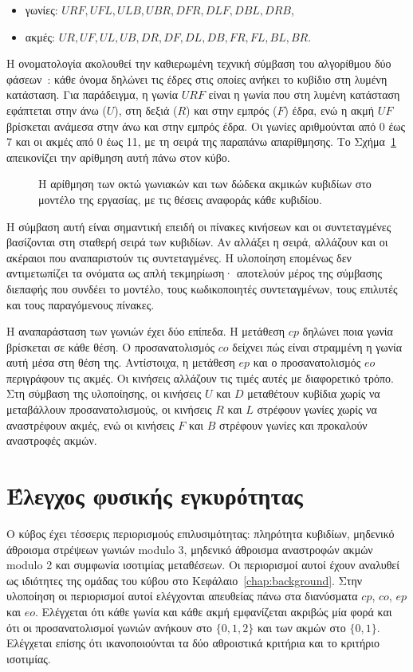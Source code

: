 \begin{itemize}
  \item γωνίες: \(URF, UFL, ULB, UBR, DFR, DLF, DBL, DRB\),
  \item ακμές: \(UR, UF, UL, UB, DR, DF, DL, DB, FR, FL, BL, BR\).
\end{itemize}

Η ονοματολογία ακολουθεί την καθιερωμένη τεχνική σύμβαση του αλγορίθμου δύο φάσεων~\cite{kociembaImplementationDetails}: κάθε όνομα δηλώνει τις έδρες στις οποίες ανήκει το κυβίδιο στη λυμένη κατάσταση. Για παράδειγμα, η γωνία \(URF\) είναι η γωνία που στη λυμένη κατάσταση εφάπτεται στην άνω (\(U\)), στη δεξιά (\(R\)) και στην εμπρός (\(F\)) έδρα, ενώ η ακμή \(UF\) βρίσκεται ανάμεσα στην άνω και στην εμπρός έδρα. Οι γωνίες αριθμούνται από 0 έως 7 και οι ακμές από 0 έως 11, με τη σειρά της παραπάνω απαρίθμησης. Το Σχήμα~\ref{fig:cubie-indexing} απεικονίζει την αρίθμηση αυτή πάνω στον κύβο.

\begin{figure}[htbp]\centering

\caption{Η αρίθμηση των οκτώ γωνιακών και των δώδεκα ακμικών κυβιδίων στο μοντέλο της εργασίας, με τις θέσεις αναφοράς κάθε κυβιδίου.}
\label{fig:cubie-indexing}
\end{figure}

Η σύμβαση αυτή είναι σημαντική επειδή οι πίνακες κινήσεων και οι συντεταγμένες βασίζονται στη σταθερή σειρά των κυβιδίων. Αν αλλάξει η σειρά, αλλάζουν και οι ακέραιοι που αναπαριστούν τις συντεταγμένες. Η υλοποίηση επομένως δεν αντιμετωπίζει τα ονόματα ως απλή τεκμηρίωση· αποτελούν μέρος της σύμβασης διεπαφής που συνδέει το μοντέλο, τους κωδικοποιητές συντεταγμένων, τους επιλυτές και τους παραγόμενους πίνακες.

Η αναπαράσταση των γωνιών έχει δύο επίπεδα. Η μετάθεση \(cp\) δηλώνει ποια γωνία βρίσκεται σε κάθε θέση. Ο προσανατολισμός \(co\) δείχνει πώς είναι στραμμένη η γωνία αυτή μέσα στη θέση της. Αντίστοιχα, η μετάθεση \(ep\) και ο προσανατολισμός \(eo\) περιγράφουν τις ακμές. Οι κινήσεις αλλάζουν τις τιμές αυτές με διαφορετικό τρόπο. Στη σύμβαση της υλοποίησης, οι κινήσεις \(U\) και \(D\) μεταθέτουν κυβίδια χωρίς να μεταβάλλουν προσανατολισμούς, οι κινήσεις \(R\) και \(L\) στρέφουν γωνίες χωρίς να αναστρέφουν ακμές, ενώ οι κινήσεις \(F\) και \(B\) στρέφουν γωνίες και προκαλούν αναστροφές ακμών.

\section{Έλεγχος φυσικής εγκυρότητας}
\label{sec:model-validity}
Ο κύβος έχει τέσσερις περιορισμούς επιλυσιμότητας: πληρότητα κυβιδίων, μηδενικό άθροισμα στρέψεων γωνιών modulo 3, μηδενικό άθροισμα αναστροφών ακμών modulo 2 και συμφωνία ισοτιμίας μεταθέσεων. Οι περιορισμοί αυτοί έχουν αναλυθεί ως ιδιότητες της ομάδας του κύβου στο Κεφάλαιο~\ref{chap:background}. Στην υλοποίηση οι περιορισμοί αυτοί ελέγχονται απευθείας πάνω στα διανύσματα \(cp\), \(co\), \(ep\) και \(eo\). Ελέγχεται ότι κάθε γωνία και κάθε ακμή εμφανίζεται ακριβώς μία φορά και ότι οι προσανατολισμοί γωνιών ανήκουν στο \(\{0,1,2\}\) και των ακμών στο \(\{0,1\}\). Ελέγχεται επίσης ότι ικανοποιούνται τα δύο αθροιστικά κριτήρια και το κριτήριο ισοτιμίας.

